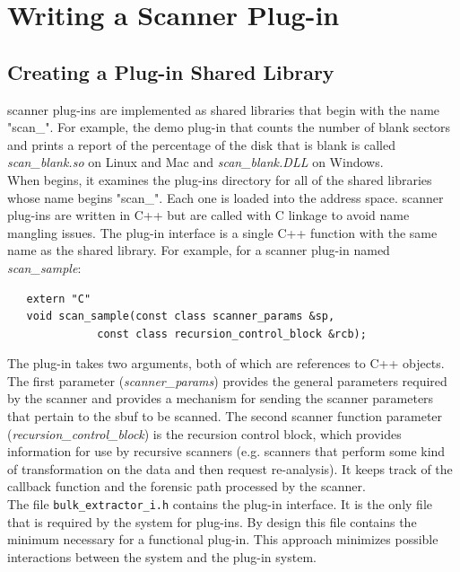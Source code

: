 \documentclass[11pt,fleqn]{article} %
\begin{document}
\section{Writing a Scanner Plug-in}
\label{WritePlugins}
\subsection{Creating a Plug-in Shared Library}
\bulk scanner plug-ins are implemented as shared libraries that begin with the name "scan\_". For example, the demo plug-in that counts the number of blank sectors and prints a report of the percentage of the disk that is blank is called \textit{scan\_blank.so} on Linux and Mac and \textit{scan\_blank.DLL} on Windows. \\

When \bulk begins, it examines the plug-ins directory for all of the shared libraries whose name begins "scan\_". Each one is loaded into the address space. \bulk scanner plug-ins are written in C++ but are called with C linkage to avoid name mangling issues. The plug-in interface is a single C++ function with the same name as the shared library.  For example, for a scanner plug-in named \textit{scan\_sample}:
\lstset{style=codelisting}
\begin{lstlisting}
   extern "C" 
   void scan_sample(const class scanner_params &sp,
              const class recursion_control_block &rcb);

\end{lstlisting}

The plug-in takes two arguments, both of which are references to C++ objects.  The first parameter (\textit{scanner\_params}) provides the general parameters required by the scanner and provides a mechanism for sending the scanner parameters that pertain to the sbuf to be scanned. The second scanner function parameter (\textit{recursion\_control\_block}) is the recursion control block, which provides information for use by recursive scanners (e.g. scanners that perform some kind of transformation on the data and then request re-analysis). It keeps track of the callback function and the forensic path processed by the scanner. \\ 

The file \texttt{bulk\_extractor\_i.h} contains the \bulk plug-in interface. It is the only file that is required by the \bulk system for plug-ins. By design this file contains the minimum necessary for a functional plug-in. This approach minimizes possible interactions between the \bulk system and the plug-in system.
\end{document}
